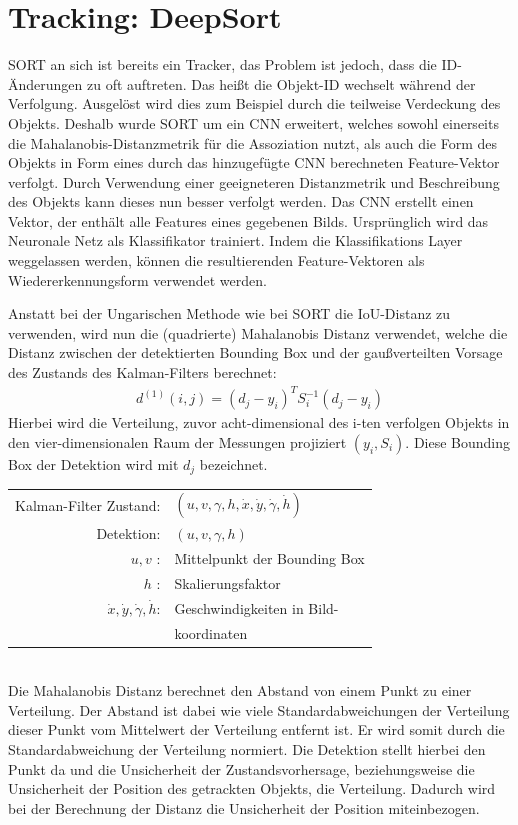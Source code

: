 \documentclass[conference]{IEEEtran}
\begin{document}
	\section{Tracking: DeepSort}
	
	SORT an sich ist bereits ein Tracker, das Problem ist jedoch, dass die ID-Änderungen zu oft auftreten. Das heißt die Objekt-ID wechselt während der Verfolgung. Ausgelöst wird dies zum Beispiel durch die teilweise Verdeckung des Objekts. Deshalb wurde SORT um ein CNN erweitert, welches sowohl einerseits die Mahalanobis-Distanzmetrik für die Assoziation nutzt, als auch die Form des Objekts in Form eines durch das hinzugefügte CNN berechneten Feature-Vektor verfolgt. Durch Verwendung einer geeigneteren Distanzmetrik und Beschreibung des Objekts kann dieses nun besser verfolgt werden.
	Das CNN erstellt einen Vektor, der enthält alle Features eines gegebenen Bilds. Ursprünglich wird das Neuronale Netz als Klassifikator trainiert. Indem die Klassifikations Layer weggelassen werden, können die resultierenden Feature-Vektoren als Wiedererkennungsform verwendet werden.
	
	Anstatt bei der Ungarischen Methode wie bei SORT die IoU-Distanz zu verwenden, wird nun die (quadrierte) Mahalanobis Distanz verwendet, welche die Distanz zwischen der detektierten Bounding Box und der gaußverteilten Vorsage des Zustands des Kalman-Filters berechnet:
	\begin{align}
	d^{(1)}(i,j)= (d_j - y_i)^TS^{-1}_i(d_j - y_i)
	\end{align}
	Hierbei wird die Verteilung, zuvor acht-dimensional des i-ten verfolgen Objekts in den vier-dimensionalen Raum der Messungen projiziert $(y_i, S_i)$. Diese Bounding Box der Detektion wird mit $d_j$ bezeichnet. \\
	
	
	\begin{tabular}{r l}
		Kalman-Filter Zustand: & $(u,v,\gamma,h,\dot{x},\dot{y},\dot{\gamma},\dot{h})$ \\
		Detektion: & $(u,v,\gamma,h)$ \\
		$u,v$ :& Mittelpunkt der Bounding Box \\
		$h$ :& Skalierungsfaktor \\
		$\dot{x},\dot{y},\dot{\gamma},\dot{h}$: & Geschwindigkeiten in Bild- \\	
		& koordinaten \\
	\end{tabular} \\

	Die Mahalanobis Distanz berechnet den Abstand von einem Punkt zu einer Verteilung. Der Abstand ist dabei wie viele Standardabweichungen der Verteilung dieser Punkt vom Mittelwert der Verteilung entfernt ist. Er wird somit durch die Standardabweichung der Verteilung normiert. Die Detektion stellt hierbei den Punkt da und die Unsicherheit der Zustandsvorhersage, beziehungsweise die Unsicherheit der Position des getrackten Objekts, die Verteilung. Dadurch wird bei der Berechnung der Distanz die Unsicherheit der Position miteinbezogen.
	
\end{document}
